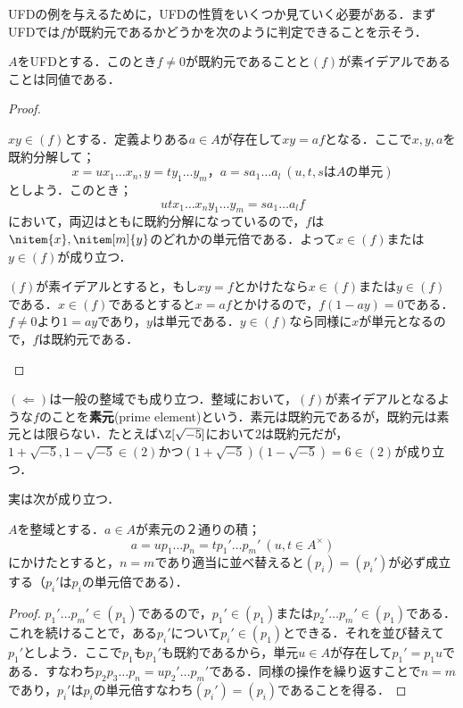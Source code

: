 UFDの例を与えるために，UFDの性質をいくつか見ていく必要がある．まずUFDでは$f$が既約元であるかどうかを次のように判定できることを示そう．
\begin{prop}
	$A$をUFDとする．このとき$f\neq0$が既約元であることと$(f)$が素イデアルであることは同値である．
\end{prop}
\begin{proof}
	\begin{eqv}
		\item $xy\in(f)$とする．定義よりある$a\in A$が存在して$xy=af$となる．ここで$x,y,a$を既約分解して；
		\[x=ux_1\dots x_n,y=ty_1\dots y_m，a=sa_1\dots a_l~(u,t,s\text{は}A\text{の単元})\]
		としよう．このとき；
		\[utx_1\dots x_ny_1\dots y_m=sa_1\dots a_lf\]
		において，両辺はともに既約分解になっているので，$f$は$\nitem{x},\nitem[m]{y}$のどれかの単元倍である．よって$x\in(f)$または$y\in(f)$が成り立つ．
		
		\item $(f)$が素イデアルとすると，もし$xy=f$とかけたなら$x\in (f)$または$y\in(f)$である．$x\in (f)$であるとすると$x=af$とかけるので，$f(1-ay)=0$である．$f\neq0$より$1=ay$であり，$y$は単元である．$y\in (f)$なら同様に$x$が単元となるので，$f$は既約元である．
	\end{eqv}
\end{proof}

$(\Longleftarrow)$は一般の整域でも成り立つ．整域において，$(f)$が素イデアルとなるような$f$のことを\textbf{素元}(prime element)という．素元は既約元であるが，既約元は素元とは限らない．たとえば$\Z[\sqrt{-5}]$において$2$は既約元だが，$1+\sqrt{-5},1-\sqrt{-5}\in(2)$かつ$(1+\sqrt{-5})(1-\sqrt{-5})=6\in (2)$が成り立つ．

実は次が成り立つ．
\begin{prop}
	$A$を整域とする．$a\in A$が素元の２通りの積；
	\[a=up_1\dots p_n=tp_1'\dots p_m'~(u,t\in A^\times)\]
	にかけたとすると，$n=m$であり適当に並べ替えると$(p_i)=(p_i')$が必ず成立する（$p_i'$は$p_i$の単元倍である）．
\end{prop}

\begin{proof}
	$p_1'\dots p_m'\in (p_1)$であるので，$p_1'\in (p_1)$または$p_2'\dots p_m'\in (p_1)$である．これを続けることで，ある$p_i'$について$p_i'\in (p_1)$とできる．それを並び替えて$p_1'$としよう．ここで$p_1$も$p_1'$も既約であるから，単元$u\in A$が存在して$p_1'=p_1u$である．すなわち$p_2p_3\dots p_n=up_2'\dots p_m'$である．同様の操作を繰り返すことで$n=m$であり，$p_i'$は$p_i$の単元倍すなわち$(p_i')=(p_i)$であることを得る．
\end{proof}

